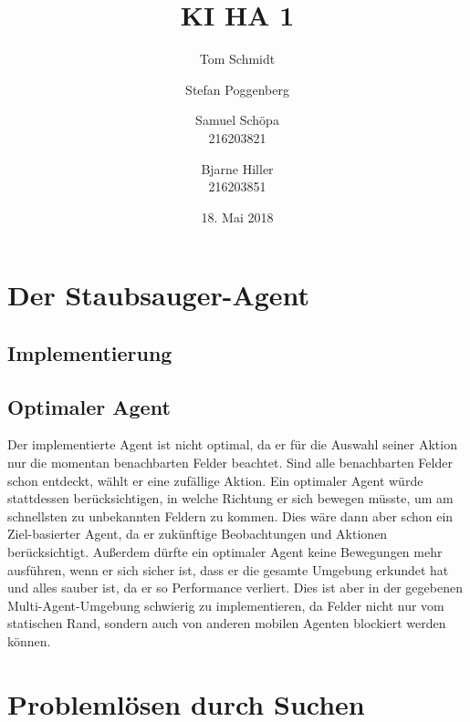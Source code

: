 \documentclass[fleqn]{scrartcl}
\author{Tom Schmidt\\ \and Stefan Poggenberg\\ \and Samuel Schöpa\\216203821 \and Bjarne Hiller\\216203851}
\title{KI HA 1}
\date{18. Mai 2018}
\begin{document}
\maketitle
\section{Der Staubsauger-Agent}
\subsection{Implementierung}

\subsection{Optimaler Agent}
Der implementierte Agent ist nicht optimal, da er für die Auswahl seiner Aktion nur die momentan benachbarten Felder beachtet. Sind alle benachbarten Felder schon entdeckt, wählt er eine zufällige Aktion. Ein optimaler Agent würde stattdessen berücksichtigen, in welche Richtung er sich bewegen müsste, um am schnellsten zu unbekannten Feldern zu kommen. Dies wäre dann aber schon ein Ziel-basierter Agent, da er zukünftige Beobachtungen und Aktionen berücksichtigt. Außerdem dürfte ein optimaler Agent keine Bewegungen mehr ausführen, wenn er sich sicher ist, dass er die gesamte Umgebung erkundet hat und alles sauber ist, da er so Performance verliert. Dies ist aber in der gegebenen Multi-Agent-Umgebung schwierig zu implementieren, da Felder nicht nur vom statischen Rand, sondern auch von anderen mobilen Agenten blockiert werden können.
\section{Problemlösen durch Suchen}
\end{document}
